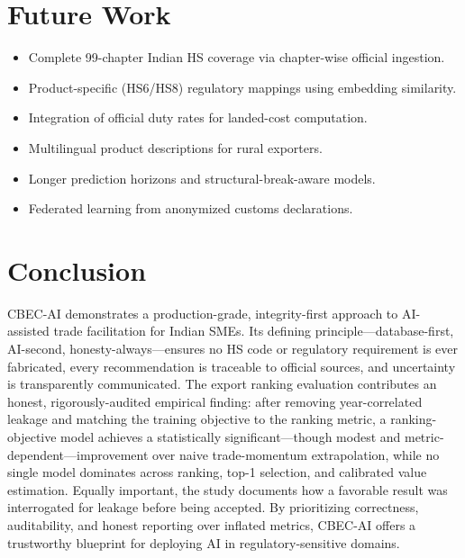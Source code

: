 \documentclass[conference]{IEEEtran}
\begin{document}
\section{Future Work}
\begin{itemize}
\item Complete 99-chapter Indian HS coverage via chapter-wise official
ingestion.
\item Product-specific (HS6/HS8) regulatory mappings using embedding
similarity.
\item Integration of official duty rates for landed-cost computation.
\item Multilingual product descriptions for rural exporters.
\item Longer prediction horizons and structural-break-aware models.
\item Federated learning from anonymized customs declarations.
\end{itemize}

\section{Conclusion}
CBEC-AI demonstrates a production-grade, integrity-first approach to
AI-assisted trade facilitation for Indian SMEs. Its defining
principle---database-first, AI-second, honesty-always---ensures no HS code
or regulatory requirement is ever fabricated, every recommendation is
traceable to official sources, and uncertainty is transparently
communicated. The export ranking evaluation contributes an honest,
rigorously-audited empirical finding: after removing year-correlated
leakage and matching the training objective to the ranking metric, a
ranking-objective model achieves a statistically significant---though
modest and metric-dependent---improvement over naive trade-momentum
extrapolation, while no single model dominates across ranking, top-1
selection, and calibrated value estimation. Equally important, the study
documents how a favorable result was interrogated for leakage before being
accepted. By prioritizing correctness, auditability, and honest reporting
over inflated metrics, CBEC-AI offers a trustworthy blueprint for deploying
AI in regulatory-sensitive domains.
\end{document}
